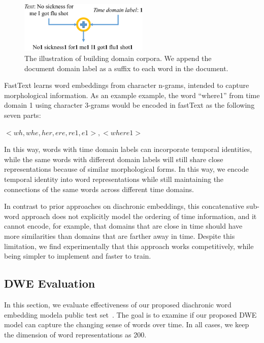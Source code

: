 \begin{figure}[htp]
\centering
\includegraphics[width=0.55\textwidth]{images/chapter3/domain_doc.pdf}
\caption{The illustration of building domain corpora. We append the document domain label as a suffix to each word in the document.}
\label{chap3:fig:domain}
\end{figure}

FastText learns word embeddings from character n-grams, intended to capture morphological information. As an example example, the word ``where1'' from time domain 1 using character 3-grams would be encoded in fastText as the following seven parts:
\begin{center}
    $<wh, whe, her, ere, re1, e1>, <where1>$
\end{center}

In this way, words with time domain labels can incorporate temporal identities, while the same words with different domain labels will still share close representations because of similar morphological forms. In this way, we encode temporal identity into word representations while still maintaining the connections of the same words across different time domains. 

In contrast to prior approaches on diachronic embeddings, this concatenative sub-word approach does not explicitly model the ordering of time information, and it cannot encode, for example, that domains that are close in time should have more similarities than domains that are farther away in time.
Despite this limitation, we find experimentally that this approach works competitively, while being simpler to implement and faster to train.


\subsection{DWE Evaluation}

In this section, we evaluate effectiveness of our proposed diachronic word embedding modela public test set~\cite{yao2018dynamic}.
The goal is to examine if our proposed DWE model can capture the changing sense of words over time.
In all cases, we keep the dimension of word representations as 200.

